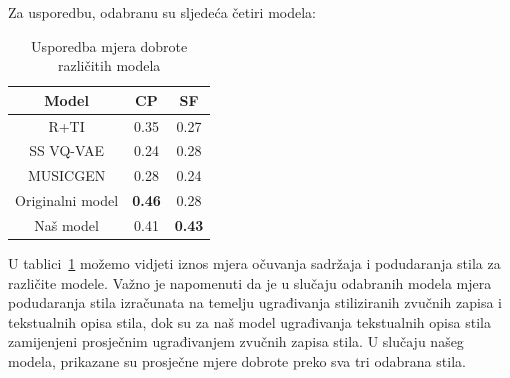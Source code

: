 
Za usporedbu, odabranu su sljedeća četiri modela:


\begin{table}[H]
    \centering
    \caption{Usporedba mjera dobrote različitih modela}
    \label{table:usporedne_mjere}
    \begin{tabular}{ |c|c|c| }
        \hline
        Model & CP& SF \\
        \hline
        R+TI\cite{forsgren2022riffusion}\cite{gal2022imageworthwordpersonalizing} & 0.35 & 0.27 \\
        SS VQ-VAE\cite{Cifka_2021} & 0.24 & 0.28 \\
        MUSICGEN\cite{copet2024simplecontrollablemusicgeneration} & 0.28 & 0.24 \\
        Originalni model\cite{huang2024musicstyletransferdiffusion} & \textbf{0.46} & 0.28 \\
        \hline
        Naš model & 0.41 & \textbf{0.43} \\
        \hline
    \end{tabular}
\end{table}

U tablici~\ref{table:usporedne_mjere} možemo vidjeti iznos mjera očuvanja sadržaja i podudaranja stila za različite modele. Važno je napomenuti da je u slučaju odabranih modela mjera podudaranja stila izračunata na temelju ugrađivanja stiliziranih zvučnih zapisa i tekstualnih opisa stila, dok su za naš model ugrađivanja tekstualnih opisa stila zamijenjeni prosječnim ugrađivanjem zvučnih zapisa stila. U slučaju našeg modela, prikazane su prosječne mjere dobrote preko sva tri odabrana stila.


